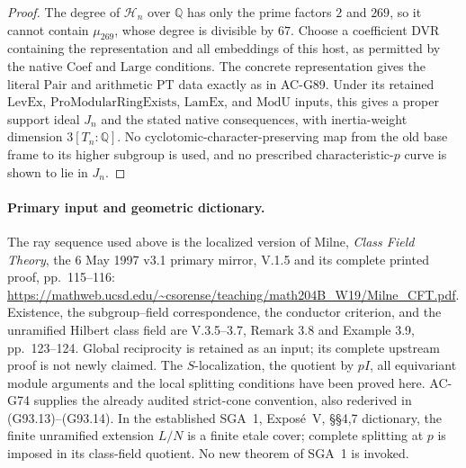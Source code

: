 \begin{proof}
The degree of \(\mathcal H_n\) over \(\mathbb Q\) has only
the prime factors \(2\) and \(269\), so it cannot contain
\(\mu_{269}\), whose degree is divisible by \(67\).
Choose a coefficient DVR containing the representation
and all embeddings of this host, as permitted by the
native \(\mathrm{Coef}\) and \(\mathrm{Large}\) conditions.
The concrete representation gives the literal \(\mathrm{Pair}\)
and arithmetic \(\mathrm{PT}\) data exactly as in AC-G89.
Under its retained \(\mathrm{LevEx}\),
\(\mathrm{ProModularRingExists}\), \(\mathrm{LamEx}\), and
\(\mathrm{ModU}\) inputs, this gives a proper support ideal
\(J_n\) and the stated native consequences, with inertia-weight
dimension \(3[T_n:\mathbb Q]\).
No cyclotomic-character-preserving map from the old base
frame to its higher subgroup is used, and no prescribed
characteristic-\(p\) curve is shown to lie in \(J_n\).
\end{proof}

\paragraph{Primary input and geometric dictionary.}
The ray sequence used above is the localized version of Milne,
\emph{Class Field Theory}, the 6 May 1997 v3.1 primary mirror,
V.1.5 and its complete printed proof, pp.~115--116:
\url{https://mathweb.ucsd.edu/~csorense/teaching/math204B_W19/Milne_CFT.pdf}.
Existence, the subgroup--field correspondence, the conductor
criterion, and the unramified Hilbert class field are V.3.5--3.7,
Remark 3.8 and Example 3.9, pp.~123--124.  Global reciprocity is
retained as an input; its complete upstream proof is not newly
claimed.  The \(S\)-localization, the quotient by \(pI\), all
equivariant module arguments and the local splitting conditions
have been proved here.  AC-G74 supplies the already audited
strict-cone convention, also rederived in (G93.13)--(G93.14).
In the established SGA~1, Expos\'e~V, \S\S4,7 dictionary,
the finite unramified extension \(L/N\) is a finite etale cover;
complete splitting at \(p\) is imposed in its class-field quotient.
No new theorem of SGA~1 is invoked.
